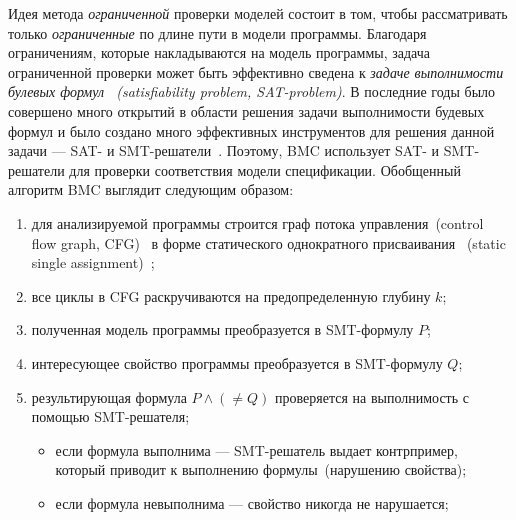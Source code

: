 Идея метода \textit{ограниченной} проверки моделей состоит в том, чтобы 
рассматривать только \textit{ограниченные} по длине пути в модели программы.
Благодаря ограничениям, которые накладываются на модель программы, задача
ограниченной проверки может быть эффективно сведена к \textit{задаче 
выполнимости булевых формул ~(satisfiability problem, SAT-problem)}. В 
последние годы было совершено много открытий в области решения задачи 
выполнимости будевых формул и было создано много эффективных инструментов для
решения данной задачи --- SAT- и SMT-решатели~\cite{sat, smt}. Поэтому, BMC использует SAT- и SMT-решатели для проверки соответствия модели спецификации.
Обобщенный алгоритм BMC выглядит следующим образом:
\begin{enumerate}
\item для анализируемой программы строится граф потока управления~(control
flow graph, CFG)~\cite{cfg} в форме статического однократного присваивания
~(static single assignment)~\cite{ssa};

\item все циклы в CFG раскручиваются на предопределенную глубину $k$;

\item полученная модель программы преобразуется в SMT-формулу $P$;

\item интересующее свойство программы преобразуется в SMT-формулу $Q$;

\item результирующая формула $P \land (\neq Q)$ проверяется на выполнимость с
помощью SMT-решателя;
	\begin{itemize}
	\item если формула выполнима --- SMT-решатель выдает контрпример, который 
	приводит к выполнению формулы~(нарушению свойства);
	\item если формула невыполнима --- свойство никогда не нарушается;
	\end{itemize}
\end{enumerate}

